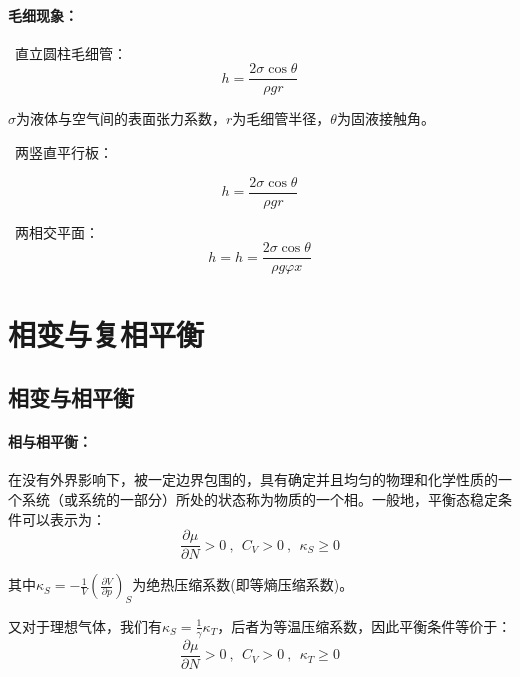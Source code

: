 \documentclass[zihao=-4,UTF8]{report}
\begin{document}
\subsubsection{毛细现象：}
\par{}\  直立圆柱毛细管：
\begin{equation}
    h = \frac{2\sigma \cos\theta}{\rho gr}
\end{equation}  
{\par\color{gray}\small
$\sigma$为液体与空气间的表面张力系数，$r$为毛细管半径，$\theta$为固液接触角。
\par}
 \par
{}\   两竖直平行板：  \par
{\par\color{gray}\small
\begin{equation}
    h = \frac{2\sigma \cos\theta}{\rho gr}
\end{equation}
\par}
\  两相交平面：
\begin{equation}
   h= h = \frac{2\sigma \cos\theta}{\rho g \varphi x}
\end{equation}   \par

\chapter{相变与复相平衡}
\section{相变与相平衡}
\subsubsection{相与相平衡：}
在没有外界影响下，被一定边界包围的，具有确定并且均匀的物理和化学性质的一个系统（或系统的一部分）所处的状态称为物质的一个相。一般地，平衡态稳定条件可以表示为：
\begin{equation}
    \frac{\partial \mu }{\partial N } >0\ ,\ \ C_V >0\ ,\ \ \kappa_S \ge 0
\end{equation}
{\par\color{gray}\small
其中$\kappa_S = - \frac{1}{V}\left(\frac{\partial V}{\partial p }\right)_{S}$为绝热压缩系数(即等熵压缩系数)。
\par}
又对于理想气体，我们有$\kappa_S = \frac{1}{\gamma}\kappa_T$，后者为等温压缩系数，因此平衡条件等价于：
\begin{equation}
    \frac{\partial \mu }{\partial N } >0\ ,\ \ C_V >0\ ,\ \ \kappa_T \ge 0
\end{equation}
\end{document}
